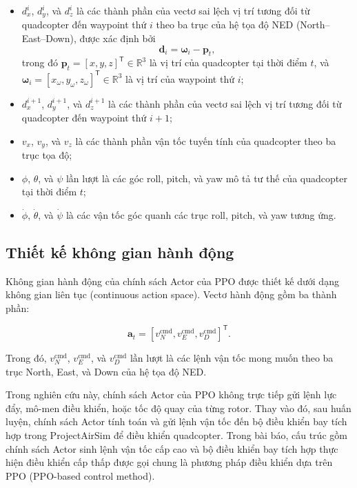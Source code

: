 \begin{itemize}
    \item $d_x^i$, $d_y^i$, và $d_z^i$ là các thành phần của vectơ sai lệch vị trí tương đối từ quadcopter đến waypoint thứ $i$ theo ba trục của hệ tọa độ NED (North--East--Down), được xác định bởi
    \begin{equation}
        \mathbf{d}_i = \boldsymbol{\omega}_i - \mathbf{p}_t,
        \label{eq:relative-position}
    \end{equation}
    trong đó $\mathbf{p}_t = [x, y, z]^{\mathsf{T}} \in \mathbb{R}^3$ là vị trí của quadcopter tại thời điểm $t$, và $\boldsymbol{\omega}_i = [x_{\omega}, y_{\omega}, z_{\omega}]^{\mathsf{T}} \in \mathbb{R}^3$ là vị trí của waypoint thứ $i$;
    \item $d_x^{i+1}$, $d_y^{i+1}$, và $d_z^{i+1}$ là các thành phần của vectơ sai lệch vị trí tương đối từ quadcopter đến waypoint thứ $i+1$;
    \item $v_x$, $v_y$, và $v_z$ là các thành phần vận tốc tuyến tính của quadcopter theo ba trục tọa độ;
    \item $\phi$, $\theta$, và $\psi$ lần lượt là các góc roll, pitch, và yaw mô tả tư thế của quadcopter tại thời điểm $t$;
    \item $\dot{\phi}$, $\dot{\theta}$, và $\dot{\psi}$ là các vận tốc góc quanh các trục roll, pitch, và yaw tương ứng.
\end{itemize}

\subsection{Thiết kế không gian hành động}

Không gian hành động của chính sách Actor của PPO được thiết kế dưới dạng không gian liên tục (continuous action space). Vectơ hành động gồm ba thành phần:

\begin{equation}
    \mathbf{a}_t = \left[v_N^{\mathrm{cmd}}, v_E^{\mathrm{cmd}}, v_D^{\mathrm{cmd}}\right]^{\mathsf{T}}.
    \label{eq:ppo-action}
\end{equation}

Trong đó, $v_N^{\mathrm{cmd}}$, $v_E^{\mathrm{cmd}}$, và $v_D^{\mathrm{cmd}}$ lần lượt là các lệnh vận tốc mong muốn theo ba trục North, East, và Down của hệ tọa độ NED.

Trong nghiên cứu này, chính sách Actor của PPO không trực tiếp gửi lệnh lực đẩy, mô-men điều khiển, hoặc tốc độ quay của từng rotor. Thay vào đó, sau huấn luyện, chính sách Actor tính toán và gửi lệnh vận tốc đến bộ điều khiển bay tích hợp trong ProjectAirSim để điều khiển quadcopter. Trong bài báo, cấu trúc gồm chính sách Actor sinh lệnh vận tốc cấp cao và bộ điều khiển bay tích hợp thực hiện điều khiển cấp thấp được gọi chung là phương pháp điều khiển dựa trên PPO (PPO-based control method).

